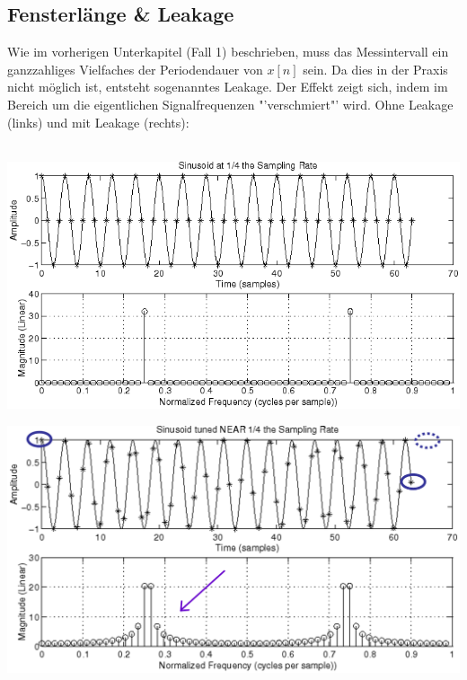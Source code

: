 \subsection{Fensterlänge \& Leakage}
Wie im vorherigen Unterkapitel (Fall 1) beschrieben, muss das Messintervall ein 
ganzzahliges Vielfaches der Periodendauer von $x[n]$ sein. Da dies in der Praxis nicht 
möglich ist, entsteht sogenanntes Leakage. Der Effekt zeigt sich, indem im Bereich
um die eigentlichen Signalfrequenzen "'verschmiert"' wird. Ohne Leakage (links) und 
mit Leakage (rechts):\\\\
\begin{minipage}{.49\textwidth}
	\begin{center}
		\includegraphics[width=\textwidth]{../fig/dft_no_leakage}
	\end{center}
\end{minipage}
\begin{minipage}{.49\textwidth}
	\begin{center}
		\includegraphics[width=\textwidth]{../fig/dft_leakage}
	\end{center}
\end{minipage}

